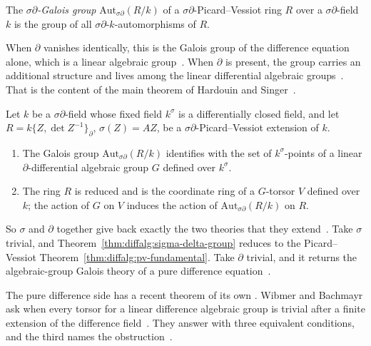 \begin{definition}\label{def:diffalg:sigma-delta-galois-group}
The \emph{$\sigma\partial$-Galois group} $\mathrm{Aut}_{\sigma\partial}(R/k)$
of a $\sigma\partial$-Picard--Vessiot ring $R$ over a
$\sigma\partial$-field $k$ is the group of all
$\sigma\partial$-$k$-automorphisms of $R$.
\end{definition}

When $\partial$ vanishes identically, this is the Galois group of the
difference equation alone, which is a linear algebraic
group~\cite[pp.~5--6]{HardouinSinger2008}. When $\partial$ is present, the
group carries an additional structure and lives among the linear differential
algebraic groups~\cite[Theorem~2.6, p.~1]{HardouinSinger2008}. That is the
content of the main theorem of Hardouin and
Singer~\cite[Theorem~2.6, p.~1]{HardouinSinger2008}.

\begin{theorem}\label{thm:diffalg:sigma-delta-group}
Let $k$ be a $\sigma\partial$-field whose fixed field $k^\sigma$ is a
differentially closed field, and let $R = k\{Z, \det Z^{-1}\}_\partial$,
$\sigma(Z) = AZ$, be a $\sigma\partial$-Picard--Vessiot extension of $k$.
\begin{enumerate}
\item The Galois group $\mathrm{Aut}_{\sigma\partial}(R/k)$ identifies
  with the set of $k^\sigma$-points of a linear
  $\partial$-differential algebraic group $G$ defined over $k^\sigma$.
\item The ring $R$ is reduced and is the coordinate ring of a $G$-torsor
  $V$ defined over $k$; the action of $G$ on $V$ induces the action of
  $\mathrm{Aut}_{\sigma\partial}(R/k)$ on $R$.
\end{enumerate}
\end{theorem}

So $\sigma$ and $\partial$ together give back exactly the two theories that
they extend~\cite[pp.~5--6]{HardouinSinger2008}. Take $\sigma$ trivial, and
Theorem~\ref{thm:diffalg:sigma-delta-group} reduces to the Picard--Vessiot
Theorem~\ref{thm:diffalg:pv-fundamental}. Take $\partial$ trivial, and it
returns the algebraic-group Galois theory of a pure difference
equation~\cite[pp.~5--6]{HardouinSinger2008}.

The pure difference side has a recent theorem of its own \cite[Theorem~1.2,
p.~2]{WibmerBachmayr2025}. Wibmer and Bachmayr ask when every torsor for a
linear difference algebraic group is trivial after a finite extension of the
difference field~\cite[Theorem~1.2, p.~2]{WibmerBachmayr2025}. They answer
with three equivalent conditions, and the third names the
obstruction~\cite[Theorem~1.2, p.~2]{WibmerBachmayr2025}.

